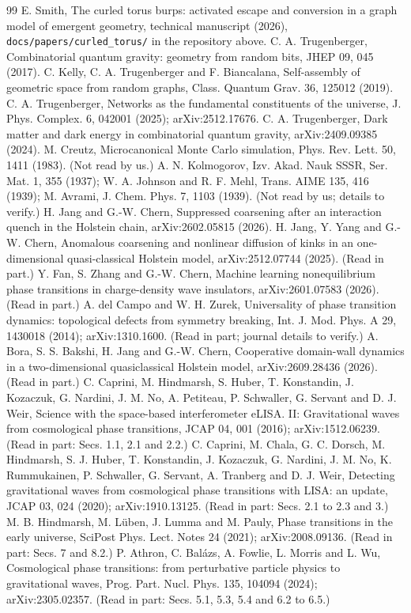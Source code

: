 \documentclass[aps,pre,10pt,twocolumn,superscriptaddress,nofootinbib]{revtex4-2}
\begin{document}
\begin{thebibliography}{99}
 E. Smith, The curled torus burps: activated escape and conversion in a graph model of emergent
geometry, technical manuscript (2026), \texttt{docs/papers/curled\_torus/} in the repository above.
 C. A. Trugenberger, Combinatorial quantum gravity: geometry from random bits, JHEP 09, 045 (2017).
 C. Kelly, C. A. Trugenberger and F. Biancalana, Self-assembly of geometric space from random
graphs, Class. Quantum Grav. 36, 125012 (2019).
 C. A. Trugenberger, Networks as the fundamental constituents of the universe, J. Phys. Complex. 6,
042001 (2025); arXiv:2512.17676.
 C. A. Trugenberger, Dark matter and dark energy in combinatorial quantum gravity, arXiv:2409.09385
(2024).
 M. Creutz, Microcanonical Monte Carlo simulation, Phys. Rev. Lett. 50, 1411 (1983). (Not read
by us.)
 A. N. Kolmogorov, Izv. Akad. Nauk SSSR, Ser. Mat. 1, 355 (1937); W. A. Johnson and R. F. Mehl, Trans.
AIME 135, 416 (1939); M. Avrami, J. Chem. Phys. 7, 1103 (1939). (Not read by us; details to verify.)
 H. Jang and G.-W. Chern, Suppressed coarsening after an interaction quench in the Holstein chain,
arXiv:2602.05815 (2026).
 H. Jang, Y. Yang and G.-W. Chern, Anomalous coarsening and nonlinear diffusion of kinks in an
one-dimensional quasi-classical Holstein model, arXiv:2512.07744 (2025). (Read in part.)
 Y. Fan, S. Zhang and G.-W. Chern, Machine learning nonequilibrium phase transitions in charge-density
wave insulators, arXiv:2601.07583 (2026). (Read in part.)
 A. del Campo and W. H. Zurek, Universality of phase transition dynamics: topological defects from
symmetry breaking, Int. J. Mod. Phys. A 29, 1430018 (2014); arXiv:1310.1600. (Read in part; journal details to
verify.)
 A. Bora, S. S. Bakshi, H. Jang and G.-W. Chern, Cooperative domain-wall dynamics in a
two-dimensional quasiclassical Holstein model, arXiv:2609.28436 (2026). (Read in part.)
 C. Caprini, M. Hindmarsh, S. Huber, T. Konstandin, J. Kozaczuk, G. Nardini, J. M. No,
A. Petiteau, P. Schwaller, G. Servant and D. J. Weir, Science with the space-based interferometer eLISA. II:
Gravitational waves from cosmological phase transitions, JCAP 04, 001 (2016); arXiv:1512.06239. (Read in part:
Secs. 1.1, 2.1 and 2.2.)
 C. Caprini, M. Chala, G. C. Dorsch, M. Hindmarsh, S. J. Huber, T. Konstandin, J. Kozaczuk,
G. Nardini, J. M. No, K. Rummukainen, P. Schwaller, G. Servant, A. Tranberg and D. J. Weir, Detecting gravitational
waves from cosmological phase transitions with LISA: an update, JCAP 03, 024 (2020); arXiv:1910.13125. (Read in
part: Secs. 2.1 to 2.3 and 3.)
 M. B. Hindmarsh, M. Lüben, J. Lumma and M. Pauly, Phase transitions in the early universe, SciPost
Phys. Lect. Notes 24 (2021); arXiv:2008.09136. (Read in part: Secs. 7 and 8.2.)
 P. Athron, C. Balázs, A. Fowlie, L. Morris and L. Wu, Cosmological phase transitions: from
perturbative particle physics to gravitational waves, Prog. Part. Nucl. Phys. 135, 104094 (2024); arXiv:2305.02357.
(Read in part: Secs. 5.1, 5.3, 5.4 and 6.2 to 6.5.)
\end{thebibliography}
\end{document}
